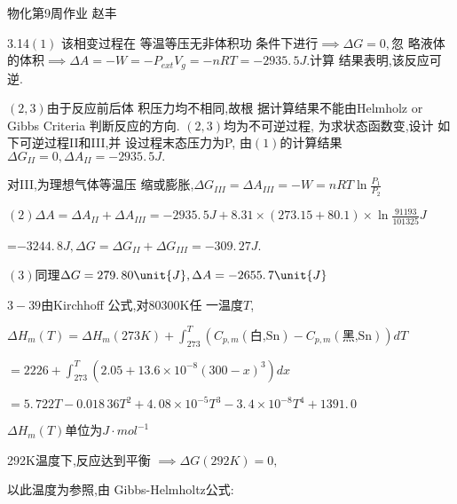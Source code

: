 \documentclass{ctexart}
\begin{document}
\bigskip \bigskip 物化第9周作业\qquad 
赵丰

3.14$\left( 1\right) $ 该相变过程在%
等温等压无非体积功%
条件下进行$\implies \Delta G=0,$忽%
略液体的体积$\implies \Delta
A=-W=-P_{ext}V_{g}=-nRT=-2935.\,\allowbreak 5\unit{J}.$计算%
结果表明,该反应可逆.

$\left( 2,3\right) $由于反应前后体%
积压力均不相同,故根%
据计算结果不能由Helmholz or
Gibbs Criteria 判断反应的方向. $%
\left( 2,3\right) $均为不可逆过程,%
为求状态函数变,设计%
如下可逆过程II和III,并%
设过程末态压力为P, 由$%
\left( 1\right) $的计算结果$\Delta
G_{II}=0,\Delta A_{II}=-2935.\,\allowbreak 5\unit{J}.$


对III,为理想气体等温压%
缩或膨胀,$\Delta G_{III}=\Delta A_{III}=-W=nRT\ln 
\frac{P_{1}}{P_{2}}$

$\left( 2\right) \Delta A=\Delta A_{II}+\Delta A_{III}=-2935.\,5\unit{J}%
+8.31\times \left( 273.15+80.1\right) \times \ln \frac{91193}{101325}\unit{J}
$

=$-3244.\,\allowbreak 8\unit{J},\Delta G=\Delta G_{II}+\Delta
G_{III}=-309.\,\allowbreak 27\unit{J}.$

$\left( 3\right) $同理$\allowbreak \Delta G=\allowbreak
279.\,\allowbreak 80\unit{J},\Delta A=\allowbreak -2655.\,\allowbreak 7\unit{%
J}$

$3-39$由Kirchhoff 公式,对80300K任%
一温度$T$,

$\Delta H_{m}\left( T\right) =\Delta H_{m}\left( 273K\right)
+\int_{273}^{T}\left( C_{p,m}\left( \text{白,Sn}\right) -C_{p,m}\left( 
\text{黑,Sn}\right) \right) dT$

$=2226+\int_{273}^{T}\left( 2.05+13.6\times 10^{-8}\left( 300-x\right)
^{3}\right) dx$

$=\allowbreak 5.\,\allowbreak 722T-0.018\,36T^{2}+4.\,\allowbreak 08\times
10^{-5}T^{3}-3.\,\allowbreak 4\times 10^{-8}\allowbreak
T^{4}+1391.\,\allowbreak 0$

\bigskip $\Delta H_{m}\left( T\right) $单位为$\unit{J}%
\cdot \unit{mol}^{-1}$

292K温度下,反应达到平衡%
$\implies \Delta G\left( 292K\right) =0,$

以此温度为参照,由%
Gibbs-Helmholtz公式:
\end{document}
